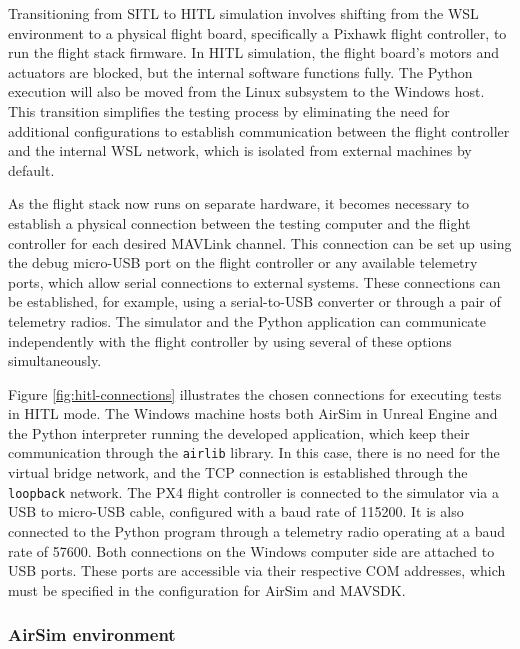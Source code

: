 Transitioning from SITL to HITL simulation involves shifting from the WSL environment to a physical flight board, specifically a Pixhawk flight controller, to run the flight stack firmware. In HITL simulation, the flight board's motors and actuators are blocked, but the internal software functions fully. The Python execution will also be moved from the Linux subsystem to the Windows host. This transition simplifies the testing process by eliminating the need for additional configurations to establish communication between the flight controller and the internal WSL network, which is isolated from external machines by default.

As the flight stack now runs on separate hardware, it becomes necessary to establish a physical connection between the testing computer and the flight controller for each desired MAVLink channel. This connection can be set up using the debug micro-USB port on the flight controller or any available telemetry ports, which allow serial connections to external systems. These connections can be established, for example, using a serial-to-USB converter or through a pair of telemetry radios. The simulator and the Python application can communicate independently with the flight controller by using several of these options simultaneously.

Figure \ref{fig:hitl-connections} illustrates the chosen connections for executing tests in HITL mode. The Windows machine hosts both AirSim in Unreal Engine and the Python interpreter running the developed application, which keep their communication through the \texttt{airlib} library. In this case, there is no need for the virtual bridge network, and the TCP connection is established through the \texttt{loopback} network. The PX4 flight controller is connected to the simulator via a USB to micro-USB cable, configured with a baud rate of 115200. It is also connected to the Python program through a telemetry radio operating at a baud rate of 57600. Both connections on the Windows computer side are attached to USB ports. These ports are accessible via their respective COM addresses, which must be specified in the configuration for AirSim and MAVSDK.


\subsubsection{AirSim environment}

